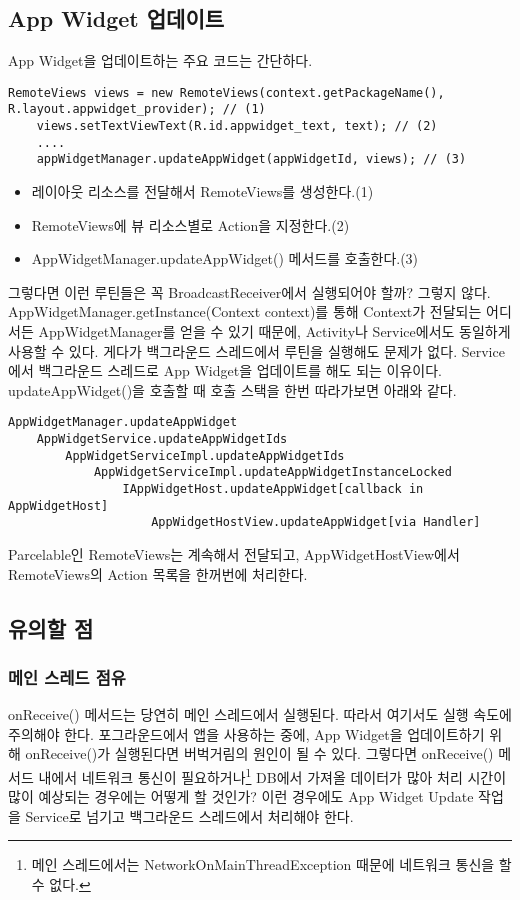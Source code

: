 \subsection{App Widget 업데이트}
App Widget을 업데이트하는 주요 코드는 간단하다.
\begin{lstlisting}[frame=single] 
	RemoteViews views = new RemoteViews(context.getPackageName(), R.layout.appwidget_provider); // (1)
	views.setTextViewText(R.id.appwidget_text, text); // (2)
	....
	appWidgetManager.updateAppWidget(appWidgetId, views); // (3)
\end{lstlisting}
\begin{itemize}
\item 레이아웃 리소스를 전달해서 RemoteViews를 생성한다.(1)
\item RemoteViews에 뷰 리소스별로 Action을 지정한다.(2)
\item AppWidgetManager.updateAppWidget() 메서드를 호출한다.(3)
\end{itemize}

그렇다면 이런 루틴들은 꼭 BroadcastReceiver에서 실행되어야 할까? 그렇지 않다. AppWidgetManager.getInstance(Context context)를 통해 Context가 전달되는 어디서든 AppWidgetManager를 얻을 수 있기 때문에, Activity나 Service에서도 동일하게 사용할 수 있다.
게다가 백그라운드 스레드에서 루틴을 실행해도 문제가 없다. Service에서 백그라운드 스레드로 App Widget을 업데이트를 해도 되는 이유이다.\\

updateAppWidget()을 호출할 때 호출 스택을 한번 따라가보면 아래와 같다.
\begin{lstlisting}[frame=single] 
AppWidgetManager.updateAppWidget
	AppWidgetService.updateAppWidgetIds
		AppWidgetServiceImpl.updateAppWidgetIds
			AppWidgetServiceImpl.updateAppWidgetInstanceLocked
				IAppWidgetHost.updateAppWidget[callback in AppWidgetHost]
					AppWidgetHostView.updateAppWidget[via Handler]
\end{lstlisting}
Parcelable인 RemoteViews는 계속해서 전달되고, AppWidgetHostView에서 RemoteViews의 Action 목록을 한꺼번에 처리한다.

\subsection{유의할 점}
\subsubsection{메인 스레드 점유}
onReceive() 메서드는 당연히 메인 스레드에서 실행된다. 따라서 여기서도 실행 속도에 주의해야 한다.
포그라운드에서 앱을 사용하는 중에, App Widget을 업데이트하기 위해 onReceive()가 실행된다면 버벅거림의 원인이 될 수 있다.
그렇다면 onReceive() 메서드 내에서 네트워크 통신이 필요하거나\footnote{메인 스레드에서는 NetworkOnMainThreadException 때문에 네트워크 통신을 할 수 없다.} DB에서 가져올 데이터가 많아 처리 시간이 많이 예상되는 경우에는 어떻게 할 것인가? 이런 경우에도 App Widget Update 작업을 Service로 넘기고 백그라운드 스레드에서 처리해야 한다.\\


